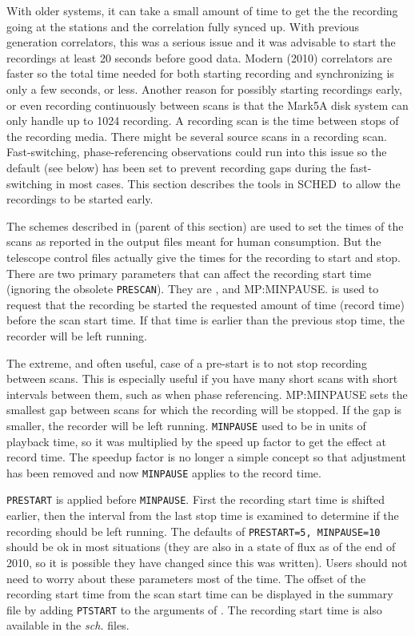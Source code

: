 \documentclass{report}
\newcommand{\schedb}{{\sc SCHED~}}
\begin{document}
With older systems, it can take a small amount of time to get the the
recording going at the stations and the correlation fully synced up.
With previous generation correlators, this was a serious issue and it
was advisable to start the recordings at least 20 seconds before good
data.  Modern (2010) correlators are faster so the total time needed
for both starting recording and synchronizing is only a few seconds,
or less.  Another reason for possibly starting recordings early, or
even recording continuously between scans is that the Mark5A disk
system can only handle up to 1024 recording.  A recording scan is the
time between stops of the recording media.  There might be several
source scans in a recording scan.  Fast-switching, phase-referencing
observations could run into this issue so the default  (see below) has been set to prevent recording
gaps during the fast-switching in most cases.  This section describes
the tools in \schedb to allow the recordings to be started early.

The schemes described in 
(parent of this section) are used to set the times of the scans as
reported in the output files meant for human consumption.  But the
telescope control files actually give the times for the recording to
start and stop.  There are two primary parameters that can affect the
recording start time (ignoring the obsolete {\tt PRESCAN}).  They are
, and 
{MP:MINPAUSE}.  
is used to request that the recording be started the requested
amount of time (record time) before the scan start time.  If that time
is earlier than the previous stop time, the recorder will be left
running.

The extreme, and often useful, case of a pre-start is to not stop
recording between scans.  This is especially useful if you have many
short scans with short intervals between them, such as when phase
referencing.   {MP:MINPAUSE} sets the smallest
gap between scans for which the recording will be stopped.  If the gap
is smaller, the recorder will be left running.  {\tt MINPAUSE} used to
be in units of playback time, so it was multiplied by the speed up
factor to get the effect at record time.  The speedup factor is no
longer a simple concept so that adjustment has been removed and now
{\tt MINPAUSE} applies to the record time.

{\tt PRESTART} is applied before {\tt MINPAUSE}.  First the recording
start time is shifted earlier, then the interval from the last
stop time is examined to determine if the recording should be left
running.  The defaults of {\tt PRESTART=5, MINPAUSE=10} should
be ok in most situations (they are also in a state of flux as of the
end of 2010, so it is possible they have changed since this was
written).  Users should not need to worry about
these parameters most of the time.  The offset of the recording start
time from the scan start time can be displayed in the summary
file by adding {\tt PTSTART} to the arguments of .  The recording start time is also available in
the {\sl sch.} files.
\end{document}
